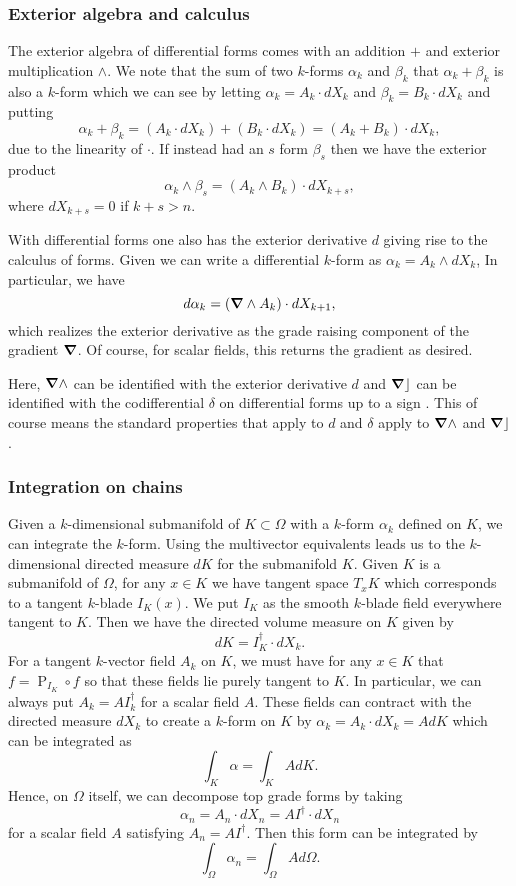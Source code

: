 \subsubsection{Exterior algebra and calculus}
The exterior algebra of differential forms comes with an addition $+$ and exterior multiplication $\wedge$.  We note that the sum of two $k$-forms $\alpha_k$ and $\beta_k$ that $\alpha_k+\beta_k$ is also a $k$-form which we can see by letting $\alpha_k = A_k \cdot dX_k$ and $\beta_k = B_k \cdot dX_k$ and putting
\[
\alpha_k + \beta_k = (A_k \cdot dX_k)+(B_k \cdot dX_k) = (A_k + B_k) \cdot dX_k,
\]
due to the linearity of $\cdot$.  If instead had an $s$ form $\beta_s$ then we have the exterior product
\[
\alpha_k \wedge \beta_s = (A_k \wedge B_k) \cdot dX_{k+s},
\]
where $dX_{k+s}=0$ if $k+s>n$.  

With differential forms one also has the exterior derivative $d$ giving rise to the calculus of forms.  Given we can write a differential $k$-form as $\alpha_k = A_k \wedge dX_k$,  In particular, we have
\[
d \alpha_k = (\boldsymbol{\nabla} \wedge A_k) \cdot dX_{k+1},
\]
which realizes the exterior derivative as the grade raising component of the gradient $\boldsymbol{\nabla}$. Of course, for scalar fields, this returns the gradient as desired. 

Here, $\boldsymbol{\nabla} \wedge$ can be identified with the exterior derivative $d$ and $\boldsymbol{\nabla} \rfloor$ can be identified with the codifferential $\delta$ on differential forms up to a sign \cite{schindler_geometric_2020}. This of course means the standard properties that apply to $d$ and $\delta$ apply to $\boldsymbol{\nabla} \wedge$ and $\boldsymbol{\nabla} \rfloor$.


\subsubsection{Integration on chains}
\label{subsubsec:integration_on_submanifolds}
Given a $k$-dimensional submanifold of $K \subset \Omega$ with a $k$-form $\alpha_k$ defined on $K$, we can integrate the $k$-form. Using the multivector equivalents leads us to the $k$-dimensional directed measure $dK$ for the submanifold $K$.  Given $K$ is a submanifold of $\Omega$, for any $x \in K$ we have tangent space $T_x K$ which corresponds to a tangent $k$-blade $I_K(x)$.  We put $I_K$ as the smooth $k$-blade field everywhere tangent to $K$. Then we have the directed volume measure on $K$ given by
\[
dK = I_K^\dagger \cdot dX_k.
\]
For a tangent $k$-vector field $A_k$ on $K$, we must have for any $x \in K$ that $f = \operatorname{P}_{I_K} \circ f$ so that these fields lie purely tangent to $K$. In particular, we can always put $A_k = A I_k^\dagger$ for a scalar field $A$. These fields can contract with the directed measure $dX_k$ to create a $k$-form on $K$ by $\alpha_k = A_k \cdot dX_k = A dK$ which can be integrated as
\[
\int_K \alpha = \int_K A dK.
\]
Hence, on $\Omega$ itself, we can decompose top grade forms by taking
\[
\alpha_n = A_n \cdot dX_n = A I^\dagger \cdot dX_n
\]
for a scalar field $A$ satisfying $A_n = AI^\dagger$. Then this form can be integrated by
\[
\int_\Omega \alpha_n = \int_\Omega A d\Omega.
\]

